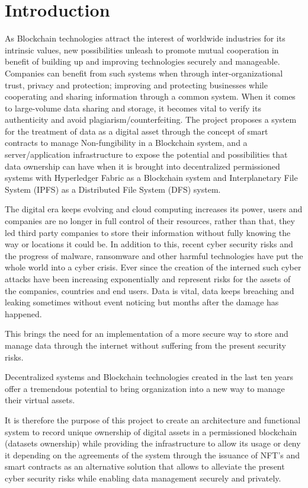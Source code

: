 \documentclass[a4paper]{article}
\begin{document}
%
\section{Introduction}
As Blockchain technologies attract the interest of worldwide industries for its intrinsic values, new possibilities unleash to promote mutual cooperation in benefit of building up and improving technologies securely and manageable\cite{nakamoto2008bitcoin}. Companies can benefit from such systems when through inter-organizational trust, privacy and protection; improving and protecting businesses while cooperating and sharing information through a common system.
When it comes to large-volume data sharing and storage, it becomes vital to verify its authenticity and avoid plagiarism/counterfeiting. The project proposes a system for the treatment of data as a digital asset through the concept of smart contracts\cite{ERCEther92:online} to manage Non-fungibility in a Blockchain system, and a server/application infrastructure to expose the potential and possibilities that data ownership can have when it is brought into decentralized permissioned systems with Hyperledger Fabric as a Blockchain system and Interplanetary File System (IPFS)
as a Distributed File System (DFS) system.

The digital era keeps evolving and cloud computing increases its power, users and companies are no longer in full control of their resources, rather than that, they led third party companies to store their information without fully knowing the way or locations it could be. In addition to this, recent cyber security risks and the progress of malware, ransomware and other harmful technologies have put the whole world into a cyber crisis. Ever since the creation of the interned such cyber attacks have been increasing exponentially and represent risks for the assets of the companies, countries and end users. Data is vital, data keeps breaching and leaking sometimes without event noticing but months after the damage has happened. 

This brings the need for an implementation of a more secure way to store and manage data through the internet without suffering from the present security risks.

Decentralized systems and Blockchain technologies created in the last ten years offer a tremendous potential to bring organization into a new way to manage their virtual assets. 

It is therefore the purpose of this project to create an architecture and functional system to record unique ownership of digital assets in a permissioned blockchain (datasets ownership) while providing the infrastructure to allow its usage or deny it depending on the agreements of the system through the issuance of NFT's and smart contracts as an alternative solution that allows to alleviate the present cyber security risks while enabling data management securely and privately.
\end{document}
